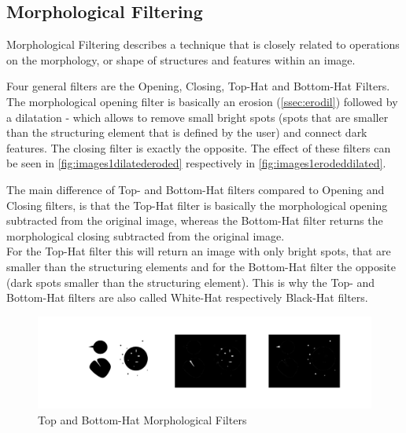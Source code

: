 \subsection{Morphological Filtering}
Morphological Filtering describes a technique that is closely related to operations on the morphology, or shape of structures and features within an image.

Four general filters are the Opening, Closing, Top-Hat and Bottom-Hat Filters. The morphological opening filter is basically an erosion (\cref{ssec:erodil}) followed by a dilatation - which allows to remove small bright spots (spots that are smaller than the structuring element that is defined by the user) and connect dark features. The closing filter is exactly the opposite. The effect of these filters can be seen in \cref{fig:images1dilatederoded} respectively in \cref{fig:images1erodeddilated}.

The main difference of Top- and Bottom-Hat filters compared to Opening and Closing filters, is that the Top-Hat filter is basically the morphological opening subtracted from the original image, whereas the Bottom-Hat filter returns the morphological closing subtracted from the original image.\\
For the Top-Hat filter this will return an image with only bright spots, that are smaller than the structuring elements and for the Bottom-Hat filter the opposite (dark spots smaller than the structuring element). This is why the Top- and Bottom-Hat filters are also called White-Hat respectively Black-Hat filters.

\begin{figure}[h!]
	\centering
	\includegraphics[width=\textwidth]{images/morphFilter.png}
	\caption{Top and Bottom-Hat Morphological Filters}
	\label{fig:morphFilt}
\end{figure}



